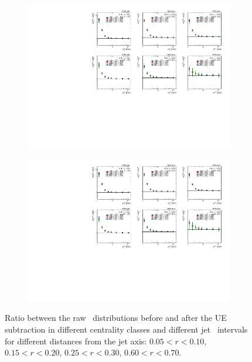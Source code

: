 \begin{figure}
\begin{subfigure}{0.5\textwidth}
\centering \includegraphics[page=6,width=1\textwidth]{figures/main/UE/ChPS_B2S_PbPb_data.pdf}
\caption{}
\label{fig:UEimpact_r6}
\end{subfigure}
\begin{subfigure}{0.5\textwidth}
\centering \includegraphics[page=10,width=1\textwidth]{figures/main/UE/ChPS_B2S_PbPb_data.pdf}
\caption{}
\label{fig:UEimpact_r10}
\end{subfigure}
\caption{Ratio between the raw \Dptr\ distributions before and after the UE  subtraction in different centrality classes and different jet \pT\ intervals for different distances from the jet axis: $0.05 < r < 0.10$, $0.15 < r < 0.20$, $0.25 < r < 0.30$, $0.60 < r < 0.70$.}
\label{fig:UEimpact}
\end{figure}


